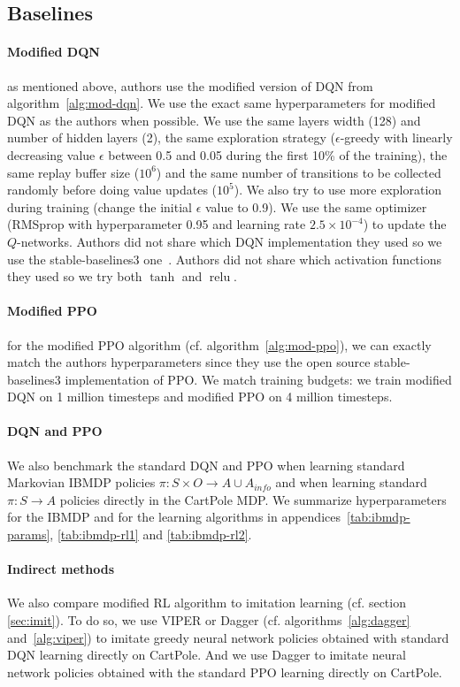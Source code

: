 \subsection{Baselines}
\paragraph{Modified DQN} as mentioned above, authors use the modified version of DQN from algorithm~\ref{alg:mod-dqn}.
We use the exact same hyperparameters for modified DQN as the authors when possible. 
We use the same layers width (128) and number of hidden layers (2), the same exploration strategy ($\epsilon$-greedy with linearly decreasing value $\epsilon$ between 0.5 and 0.05 during the first 10\% of the training),
the same replay buffer size ($10^6$) and the same number of transitions to be collected randomly before doing value updates ($10^5$).
We also try to use more exploration during training (change the initial $\epsilon$ value to 0.9).
We use the same optimizer (RMSprop with hyperparameter 0.95 and learning rate $2.5 \times 10^{-4}$) to update the $Q$-networks.
Authors did not share which DQN implementation they used so we use the stable-baselines3 one~\cite{stable-baselines3}.
Authors did not share which activation functions they used so we try both $\operatorname{tanh}$ and $\operatorname{relu}$. 

\paragraph{Modified PPO} for the modified PPO algorithm (cf. algorithm~\ref{alg:mod-ppo}), we can exactly match the authors hyperparameters since they use the open source stable-baselines3 implementation of PPO.
We match training budgets: we train modified DQN on 1 million timesteps and modified PPO on 4 million timesteps.

\paragraph{DQN and PPO} We also benchmark the standard DQN and PPO when learning standard Markovian IBMDP policies $\pi:S\times O\rightarrow A\cup A_{info}$ and when learning standard $\pi:S\rightarrow A$ policies directly in the CartPole MDP.
We summarize hyperparameters for the IBMDP and for the learning algorithms in appendices~\ref{tab:ibmdp-params}, \ref{tab:ibmdp-rl1} and \ref{tab:ibmdp-rl2}.

\paragraph{Indirect methods} We also compare modified RL algorithm to imitation learning (cf. section \ref{sec:imit}).
To do so, we use VIPER or Dagger (cf. algorithms~\ref{alg:dagger} and~\ref{alg:viper}) to imitate greedy neural network policies obtained with standard DQN learning directly on CartPole.
And we use Dagger to imitate neural network policies obtained with the standard PPO learning directly on CartPole. 

